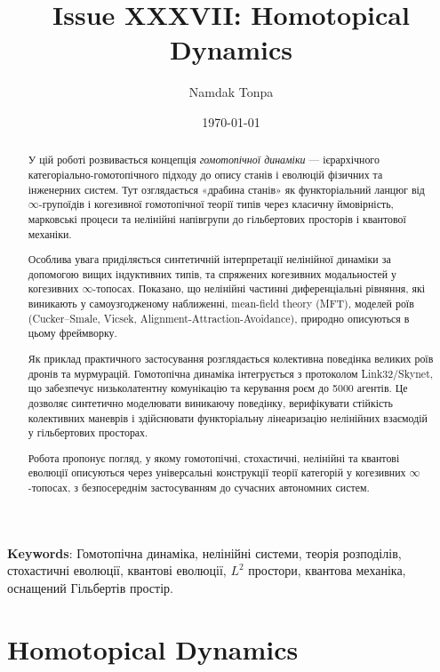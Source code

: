 \documentclass[a4paper,12pt]{article}
\begin{document}
\title{Issue XXXVII: Homotopical Dynamics}
\author{Namdak Tonpa}
\date{\today}
\maketitle

\begin{abstract}
У цій роботі розвивається концепція \emph{гомотопічної динаміки} — ієрархічного
категоріально-гомотопічного підходу до опису станів і еволюцій фізичних та інженерних систем.
Тут озглядається «драбина станів» як функторіальний ланцюг від \(\infty\)-групоїдів
і когезивної гомотопічної теорії типів через класичну ймовірність,
марковські процеси та нелінійні напівгрупи до гільбертових просторів і квантової механіки.

Особлива увага приділяється синтетичній інтерпретації нелінійної динаміки
за допомогою вищих індуктивних типів,  та спряжених когезивних модальностей
у когезивних $\infty$-топосах. Показано, що нелінійні частинні диференціальні рівняння,
які виникають у самоузгодженому наближенні, mean-field theory (MFT), моделей роїв (Cucker--Smale, Vicsek, Alignment-Attraction-Avoidance),
природно описуються в цьому фреймворку.

Як приклад практичного застосування розглядається колективна поведінка
великих роїв дронів та мурмурацій. Гомотопічна динаміка інтегрується з
протоколом Link32/Skynet, що забезпечує низьколатентну комунікацію та
керування роєм до 5000 агентів. Це дозволяє синтетично моделювати виникаючу
поведінку, верифікувати стійкість колективних маневрів і здійснювати функторіальну
лінеаризацію нелінійних взаємодій у гільбертових просторах.

Робота пропонує погляд, у якому гомотопічні, стохастичні, нелінійні та квантові
еволюції описуються через універсальні конструкції теорії категорій у когезивних
$\infty$-топосах, з безпосереднім застосуванням до сучасних автономних систем.
\end{abstract}

{\bf Keywords}: Гомотопічна динаміка, нелінійні системи, теорія розподілів, стохастичні еволюції, квантові еволюції,
$L^2$ простори, квантова механіка, оснащений Гільбертів простір.

\ifincludeTOC
\newpage
\tableofcontents
\fi

\newpage
\section{Homotopical Dynamics}
\end{document}
